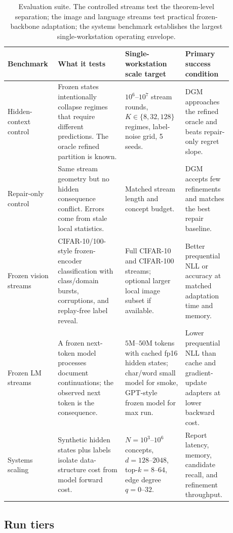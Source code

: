 \begin{table}[h]
\centering
\footnotesize
\begin{tabular}{>{\raggedright\arraybackslash}p{0.18\linewidth}
>{\raggedright\arraybackslash}p{0.28\linewidth}
>{\raggedright\arraybackslash}p{0.24\linewidth}
>{\raggedright\arraybackslash}p{0.18\linewidth}}
\toprule
Benchmark & What it tests & Single-workstation scale target & Primary success condition \\
\midrule
Hidden-context control & Frozen states intentionally collapse regimes that require different predictions. The oracle refined partition is known. & $10^6$--$10^7$ stream rounds, $K\in\{8,32,128\}$ regimes, label-noise grid, 5 seeds. & DGM approaches the refined oracle and beats repair-only regret slope. \\
Repair-only control & Same stream geometry but no hidden consequence conflict. Errors come from stale local statistics. & Matched stream length and concept budget. & DGM accepts few refinements and matches the best repair baseline. \\
Frozen vision streams & CIFAR-10/100-style frozen-encoder classification with class/domain bursts, corruptions, and replay-free label reveal. & Full CIFAR-10 and CIFAR-100 streams; optional larger local image subset if available. & Better prequential NLL or accuracy at matched adaptation time and memory. \\
Frozen LM streams & A frozen next-token model processes document continuations; the observed next token is the consequence. & $5$M--$50$M tokens with cached fp16 hidden states; char/word small model for smoke, GPT-style frozen model for max run. & Lower prequential NLL than cache and gradient-update adapters at lower backward cost. \\
Systems scaling & Synthetic hidden states plus labels isolate data-structure cost from model forward cost. & $N=10^3$--$10^6$ concepts, $d=128$--$2048$, top-$k=8$--$64$, edge degree $q=0$--$32$. & Report latency, memory, candidate recall, and refinement throughput. \\
\bottomrule
\end{tabular}
\caption{Evaluation suite. The controlled streams test the theorem-level
separation; the image and language streams test practical frozen-backbone
adaptation; the systems benchmark establishes the largest single-workstation
operating envelope.}
\label{tab:dgm-evaluation-suite}
\end{table}

\subsection{Run tiers}

